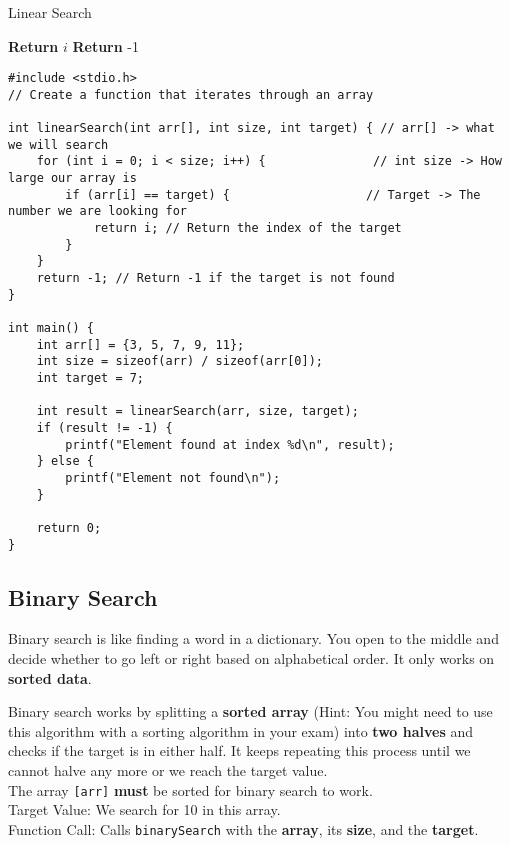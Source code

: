\documentclass[a4paper,12pt]{article}
\begin{document}
\begin{algorithm}[H]
\caption{Linear Search}
\begin{algorithmic}[1]
            \State \textbf{Return} $i$ 
        \EndIf
    \EndFor
    \State \textbf{Return} -1 
\EndProcedure
\end{algorithmic}
\end{algorithm}

\lstset{language=C}
\begin{lstlisting}
#include <stdio.h>
// Create a function that iterates through an array

int linearSearch(int arr[], int size, int target) { // arr[] -> what we will search
    for (int i = 0; i < size; i++) {               // int size -> How large our array is
        if (arr[i] == target) {                   // Target -> The number we are looking for
            return i; // Return the index of the target
        }
    }
    return -1; // Return -1 if the target is not found
}

int main() {
    int arr[] = {3, 5, 7, 9, 11};
    int size = sizeof(arr) / sizeof(arr[0]);
    int target = 7;

    int result = linearSearch(arr, size, target);
    if (result != -1) {
        printf("Element found at index %d\n", result);
    } else {
        printf("Element not found\n");
    }

    return 0;
}
\end{lstlisting}

\newpage

\subsection{Binary Search}

Binary search is like finding a word in a dictionary. You open to the middle and decide whether to go left or right based on alphabetical order. It only works on \textbf{sorted data}.

Binary search works by splitting a \textbf{sorted array} (Hint: You might need to use this algorithm with a sorting algorithm in your exam) into \textbf{two halves} and checks if the target is in either half. It keeps repeating this process until we cannot halve any more or we reach the target value.\\
The array \verb|[arr]| \textbf{must} be sorted for binary search to work.\\
Target Value: We search for 10 in this array.\\
Function Call: Calls \verb|binarySearch| with the \textbf{array}, its \textbf{size}, and the \textbf{target}.
\end{document}
